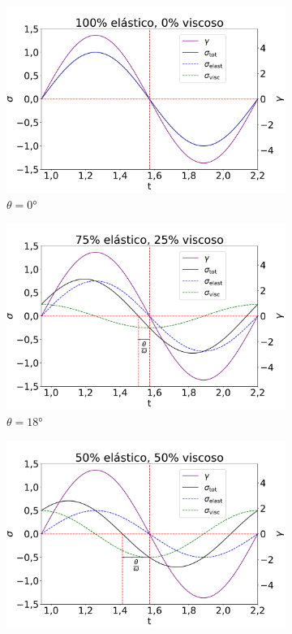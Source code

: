 			\begin{figure}[h]
				\begin{subfigure}[t]{0.3\textwidth}
					\centering
					\includegraphics[width=\textwidth]{./imagens/reologia/Simulacao_visc_0}
					\caption{\(\theta=0°\)}
					\label{fig:osc_sim0}
				\end{subfigure}%
				\begin{subfigure}[t]{0.3\textwidth}
					\centering
					\includegraphics[width=\textwidth]{./imagens/reologia/Simulacao_visc_25}
					\caption{\(\theta=18°\)}
					\label{fig:osc_sim25}
				\end{subfigure}%
				\begin{subfigure}[t]{0.3\textwidth}
					\centering
					\includegraphics[width=\textwidth]{./imagens/reologia/Simulacao_visc_50}

\end{subfigure}
\end{figure}
